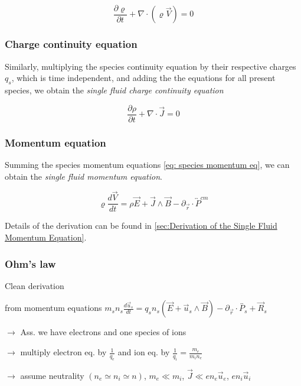 \begin{equation}
    \frac{\partial \varrho}{\partial t} + \nabla \cdot (\varrho \vec{V}) = 0
\end{equation}


\subsubsection{Charge continuity equation}
Similarly, multiplying the species continuity equation by their respective charges $q_s$, which is time independent, and adding the the equations for all present species, we obtain the \emph{single fluid charge continuity equation}

\begin{equation}
    \frac{\partial \rho}{\partial t} + \nabla \cdot  \vec{J} = 0
\end{equation} 

\subsubsection{Momentum equation}

Summing the species momentum equations \eqref{eq: species momentum eq}, we can obtain the \emph{single fluid momentum equation}.

\begin{equation}\label{eq: Single fluid momentum eq.}
    \varrho \frac{d\vec{V}}{dt} = \rho \vec{E} + \vec{J} \wedge \vec{B} - \partial_{\vec{r}} \cdot \overleftrightarrow{P}^{cm}
\end{equation}

Details of the derivation can be found in \ref{sec:Derivation of the Single Fluid Momentum Equation}.



\subsubsection{Ohm's law}

{\color{magenta} Clean derivation}

from momentum equations \quad $m_s n_s \frac{d\vec{u}_s}{dt} = q_s n_s \left(\vec{E} + \vec{u}_s \wedge \vec{B}\right) - \partial_{\vec{r}} \cdot \overleftrightarrow{P_s} + \vec{R}_s$

$\to$ Ass. we have electrons and one species of ions

$\to$ multiply electron eq. by $\frac{1}{q_e}$ and ion eq. by $\frac{1}{q_i} = \frac{m_e}{m_i n_e}$

$\to$ assume neutrality $(n_e \simeq n_i \simeq n)$, $m_e \ll m_i$, $\vec{J} \ll e n_e \vec{u}_e$, $e n_i \vec{u}_i$

